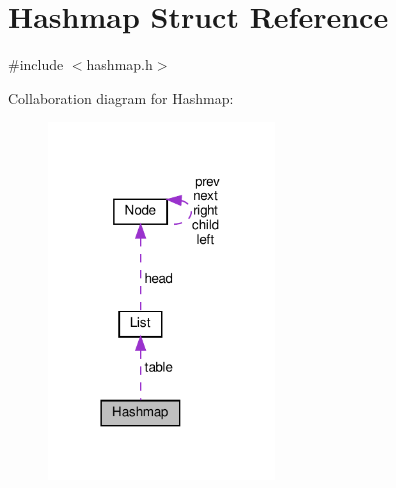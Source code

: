 \hypertarget{structHashmap}{}\section{Hashmap Struct Reference}
\label{structHashmap}


{\ttfamily \#include $<$hashmap.\+h$>$}



Collaboration diagram for Hashmap\+:\nopagebreak
\begin{figure}[H]
\begin{center}
\leavevmode
\includegraphics[width=170pt]{structHashmap__coll__graph}
\end{center}
\end{figure}
